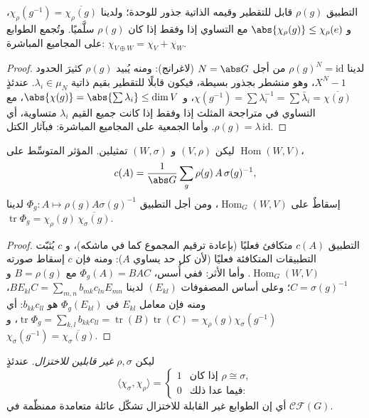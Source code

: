 \begin{proposition}\label{prop:b3:representations:charbasics}
التطبيق $\rho(g)$ قابل للتقطير وقيمه الذاتية جذور للوحدة؛ ولدينا
$\chi_\rho(g^{-1}) = \overline{\chi_\rho(g)}$، و $\abs{\chi_\rho(g)} \leq \chi_\rho(e)$ مع التساوي إذا وفقط إذا كان $\rho(g)$ سلَّميًا.
وتُجمع الطوابع على المجاميع المباشرة: $\chi_{V
\oplus W} = \chi_V + \chi_W$.
\end{proposition}

\begin{proof}
لدينا $\rho(g)^N = \mathrm{id}$ من أجل $N = \abs G$ (لاغرانج): ومنه يُبيد $\rho(g)$
كثيرَ الحدود $X^N - 1$، وهو منشطر بجذور بسيطة، فيكون قابلًا
للتقطير بقيم ذاتية $\lambda_i \in \mu_N$. عندئذٍ $\chi(g^{-1}) = \sum \lambda_i^{-1} = \sum\bar\lambda_i =
\overline{\chi(g)}$، و $\abs{\chi(g)} = \abs{\sum\lambda_i}
\leq \dim V$، مع التساوي
في متراجحة المثلث إذا وفقط إذا كانت جميع القيم $\lambda_i$
متساوية، أي $\rho(g) = \lambda\,\mathrm{id}$. وأما الجمعية على المجاميع المباشرة: فبآثار
الكتل.
\end{proof}

\begin{lemma}\label{lem:b3:representations:homtrace}
ليكن $(V, \rho)$ و $(W, \sigma)$ تمثيلين. المؤثر المتوسِّط على
$\operatorname{Hom}(W, V)$،
\[
c(A) = \frac1{\abs G}\sum_{g}\rho(g)\,A\,\sigma(g)^{-1},
\]
إسقاطٌ على $\operatorname{Hom}_G(W, V)$، ومن أجل التطبيق $\Phi_g \colon A \mapsto \rho(g)A\sigma(g)^{-1}$ لدينا $\operatorname{tr}\Phi_g =
\chi_\rho(g)\,\overline{\chi_\sigma(g)}$.
\end{lemma}

\begin{proof}
التطبيق $c(A)$ متكافئ فعليًا (بإعادة ترقيم المجموع كما في ماشكه)،
و $c$ يُثبّت التطبيقات المتكافئة فعليًا (لأن كل حد يساوي $A$):
ومنه فإن $c$ إسقاط صورته $\operatorname{Hom}_G(W, V)$. وأما الأثر: ففي أُسس، $\Phi_g(A) = BAC$ مع
$B = \rho(g)$ و $C = \sigma(g)^{-1}$؛ وعلى أساس المصفوفات $(E_{kl})$ لدينا
$BE_{kl}C = \sum_{m,n}
b_{mk}c_{ln}E_{mn}$، ومنه فإن معامل $E_{kl}$ في $\Phi_g(E_{kl})$ هو
$b_{kk}c_{ll}$: أي $\operatorname{tr}\Phi_g =
\sum_{k,l}b_{kk}c_{ll} = \operatorname{tr}(B)
\operatorname{tr}(C) = \chi_\rho(g)\chi_\sigma(g^{-1})$، و $\chi_\sigma(g^{-1}) = \overline{\chi_\sigma(g)}$.
\end{proof}

\begin{theorem}
\label{thm:b3:representations:orthogonality}
ليكن $\rho, \sigma$ \emph{غير قابلين للاختزال}. عندئذٍ
\[
\langle\chi_\sigma, \chi_\rho\rangle =
\begin{cases}
1 & \text{إذا كان } \rho \cong \sigma,\\
0 & \text{فيما عدا ذلك:}
\end{cases}
\]
أي إن الطوابع غير القابلة للاختزال تشكّل عائلة متعامدة ممنظّمة في
$\mathcal{CF}(G)$.
\end{theorem}

